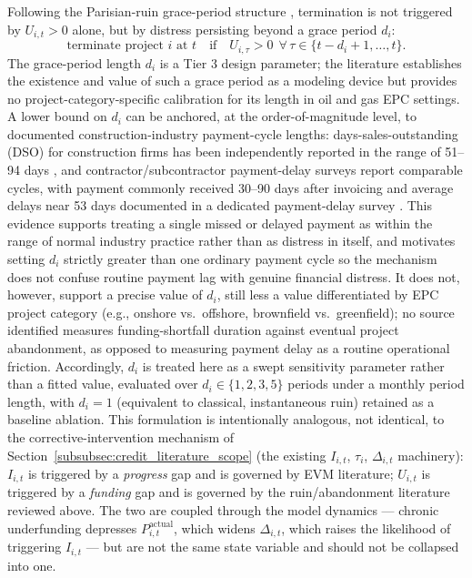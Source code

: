 Following the Parisian-ruin grace-period structure \cite{dassioswu2008parisian}, termination is not triggered by $U_{i,t} > 0$ alone, but by distress persisting beyond a grace period $d_i$:
\[
\text{terminate project } i \text{ at } t \quad \text{if} \quad U_{i,\tau} > 0 \ \ \forall\, \tau \in \{t-d_i+1, \ldots, t\}.
\]
The grace-period length $d_i$ is a Tier 3 design parameter; the literature establishes the existence and value of such a grace period as a modeling device but provides no project-category-specific calibration for its length in oil and gas EPC settings. A lower bound on $d_i$ can be anchored, at the order-of-magnitude level, to documented construction-industry payment-cycle lengths: days-sales-outstanding (DSO) for construction firms has been independently reported in the range of 51--94 days \cite{dnb2021dso,pwc2021workingcapital}, and contractor/subcontractor payment-delay surveys report comparable cycles, with payment commonly received 30--90 days after invoicing and average delays near 53 days documented in a dedicated payment-delay survey \cite{munyaobamfo2011delayedpayment}. This evidence supports treating a single missed or delayed payment as within the range of normal industry practice rather than as distress in itself, and motivates setting $d_i$ strictly greater than one ordinary payment cycle so the mechanism does not confuse routine payment lag with genuine financial distress. It does not, however, support a precise value of $d_i$, still less a value differentiated by EPC project category (e.g., onshore vs.\ offshore, brownfield vs.\ greenfield); no source identified measures funding-shortfall duration against eventual project abandonment, as opposed to measuring payment delay as a routine operational friction. Accordingly, $d_i$ is treated here as a swept sensitivity parameter rather than a fitted value, evaluated over $d_i \in \{1, 2, 3, 5\}$ periods under a monthly period length, with $d_i = 1$ (equivalent to classical, instantaneous ruin) retained as a baseline ablation.
This formulation is intentionally analogous, not identical, to the corrective-intervention mechanism of Section~\ref{subsubsec:credit_literature_scope} (the existing $I_{i,t}$, $\tau_i$, $\Delta_{i,t}$ machinery): $I_{i,t}$ is triggered by a \emph{progress} gap and is governed by EVM literature; $U_{i,t}$ is triggered by a \emph{funding} gap and is governed by the ruin/abandonment literature reviewed above. The two are coupled through the model dynamics — chronic underfunding depresses $P_{i,t}^{\mathrm{actual}}$, which widens $\Delta_{i,t}$, which raises the likelihood of triggering $I_{i,t}$ — but are not the same state variable and should not be collapsed into one.

